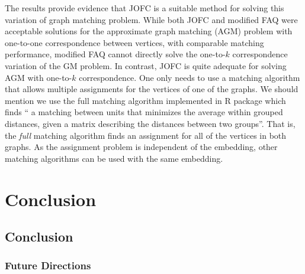 \documentclass[12pt,oneside,final]{thesis}\usepackage[]{graphicx}\usepackage[]{color}
\begin{document}
The results provide evidence that JOFC is a suitable method for solving this variation of graph matching problem. While  both JOFC and modified FAQ were acceptable solutions for the approximate graph matching (AGM) problem with one-to-one correspondence between vertices, with comparable matching performance, modified FAQ  cannot directly solve  the one-to-$k$ correspondence variation of the GM problem. In contrast, JOFC is quite adequate for solving AGM with one-to-$k$ correspondence. One only needs to use a matching algorithm that allows multiple assignments for the vertices of one of the graphs. We should mention we use the full matching algorithm implemented in R package \cite{optmatch} which finds  `` a matching between units that minimizes the average within grouped distances, given a matrix describing the distances between two groups''\cite{optmatch_manual}. That is, the \emph{full} matching algorithm finds an assignment for all of the vertices in both graphs. As the assignment problem is independent of the embedding, other matching algorithms can be used with the same embedding.



\chapter{Conclusion}
\label{sec:conclusion}

\section{Conclusion}
\subsection{Future Directions}








% 
% 
% 
% 
% 
\end{document}
